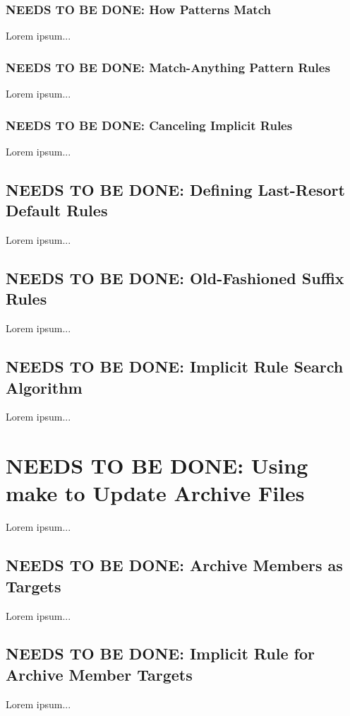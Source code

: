 \documentclass{charun}
\begin{document}
\begin{multicols*}{2}
\color{gray}
\subsubsection{NEEDS TO BE DONE: How Patterns Match}
Lorem ipsum...
\color{black}

\color{gray}
\subsubsection{NEEDS TO BE DONE: Match-Anything Pattern Rules}
Lorem ipsum...
\color{black}

\color{gray}
\subsubsection{NEEDS TO BE DONE: Canceling Implicit Rules}
Lorem ipsum...
\color{black}

\color{gray}
\subsection{NEEDS TO BE DONE: Defining Last-Resort Default Rules}
Lorem ipsum...
\color{black}

\color{gray}
\subsection{NEEDS TO BE DONE: Old-Fashioned Suffix Rules}
Lorem ipsum...
\color{black}

\color{gray}
\subsection{NEEDS TO BE DONE: Implicit Rule Search Algorithm}
Lorem ipsum...
\color{black}


\color{gray}
\section{NEEDS TO BE DONE: Using make to Update Archive Files}
Lorem ipsum...
\color{black}


\color{gray}
\subsection{NEEDS TO BE DONE: Archive Members as Targets}
Lorem ipsum...
\color{black}

\color{gray}
\subsection{NEEDS TO BE DONE: Implicit Rule for Archive Member Targets}
Lorem ipsum...
\color{black}


\end{multicols*}
\end{document}
